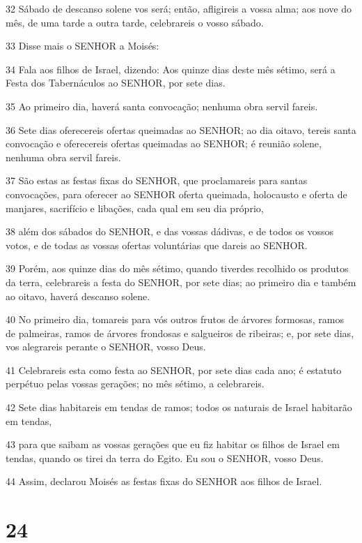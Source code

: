 \par 32 Sábado de descanso solene vos será; então, afligireis a vossa alma; aos nove do mês, de uma tarde a outra tarde, celebrareis o vosso sábado.
\par 33 Disse mais o SENHOR a Moisés:
\par 34 Fala aos filhos de Israel, dizendo: Aos quinze dias deste mês sétimo, será a Festa dos Tabernáculos ao SENHOR, por sete dias.
\par 35 Ao primeiro dia, haverá santa convocação; nenhuma obra servil fareis.
\par 36 Sete dias oferecereis ofertas queimadas ao SENHOR; ao dia oitavo, tereis santa convocação e oferecereis ofertas queimadas ao SENHOR; é reunião solene, nenhuma obra servil fareis.
\par 37 São estas as festas fixas do SENHOR, que proclamareis para santas convocações, para oferecer ao SENHOR oferta queimada, holocausto e oferta de manjares, sacrifício e libações, cada qual em seu dia próprio,
\par 38 além dos sábados do SENHOR, e das vossas dádivas, e de todos os vossos votos, e de todas as vossas ofertas voluntárias que dareis ao SENHOR.
\par 39 Porém, aos quinze dias do mês sétimo, quando tiverdes recolhido os produtos da terra, celebrareis a festa do SENHOR, por sete dias; ao primeiro dia e também ao oitavo, haverá descanso solene.
\par 40 No primeiro dia, tomareis para vós outros frutos de árvores formosas, ramos de palmeiras, ramos de árvores frondosas e salgueiros de ribeiras; e, por sete dias, vos alegrareis perante o SENHOR, vosso Deus.
\par 41 Celebrareis esta como festa ao SENHOR, por sete dias cada ano; é estatuto perpétuo pelas vossas gerações; no mês sétimo, a celebrareis.
\par 42 Sete dias habitareis em tendas de ramos; todos os naturais de Israel habitarão em tendas,
\par 43 para que saibam as vossas gerações que eu fiz habitar os filhos de Israel em tendas, quando os tirei da terra do Egito. Eu sou o SENHOR, vosso Deus.
\par 44 Assim, declarou Moisés as festas fixas do SENHOR aos filhos de Israel.

\chapter{24}

